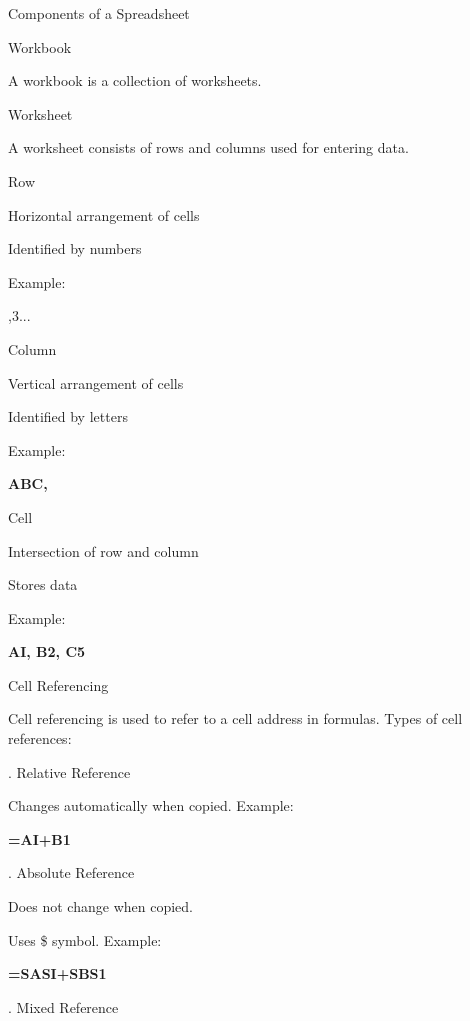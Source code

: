\documentclass[10pt,a4paper]{article}
\begin{document}
\noindent Components of a Spreadsheet\par
\noindent Workbook\par
\noindent A workbook is a collection of worksheets.\par

\noindent Worksheet\par
\noindent A worksheet consists of rows and columns used for entering data.\par

\noindent Row\par
\noindent Horizontal arrangement of cells\par
\noindent Identified by numbers\par
\clearpage
\noindent Example:\par
{},3...\par

\noindent Column\par
\noindent Vertical arrangement of cells\par
\noindent Identified by letters\par

\noindent Example:\par
\medskip\noindent\textbf{ABC,}\par

\noindent Cell\par
\noindent Intersection of row and column\par
\noindent Stores data\par

\noindent Example:\par
\medskip\noindent\textbf{AI, B2, C5}\par

\noindent Cell Referencing\par
\noindent Cell referencing is used to refer to a cell address in formulas. Types of cell references:\par
{}. Relative Reference\par

\noindent Changes automatically when copied. Example:\par
\medskip\noindent\textbf{=AI+B1}\par
{}. Absolute Reference\par
\noindent Does not change when copied.\par

\noindent Uses \$ symbol. Example:\par
\medskip\noindent\textbf{=SASI+SBS1}\par
{}. Mixed Reference\par
\end{document}
